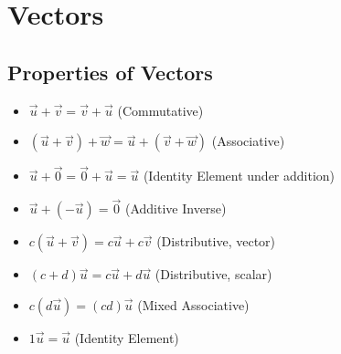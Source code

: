 \documentclass[12pt]{article}
\begin{document}
\section{Vectors}
\subsection{Properties of Vectors}
\begin{itemize}
\item $\vec{u} + \vec{v} = \vec{v} + \vec{u}$ (Commutative)
\item $(\vec{u} + \vec{v}) + \vec{w} = \vec{u} + (\vec{v} + \vec{w})$ (Associative)
\item $\vec{u} + \vec{0} = \vec{0} + \vec{u} = \vec{u}$ (Identity Element under addition)
\item $\vec{u} + (-\vec{u}) = \vec{0}$ (Additive Inverse)
\item $c(\vec{u} + \vec{v}) = c\vec{u} + c\vec{v}$ (Distributive, vector)
\item $(c+d)\vec{u} = c\vec{u} + d\vec{u}$ (Distributive, scalar)
\item $c(d\vec{u}) = (cd)\vec{u}$ (Mixed Associative)
\item $1\vec{u} = \vec{u}$ (Identity Element)
\end{itemize}
\end{document}
